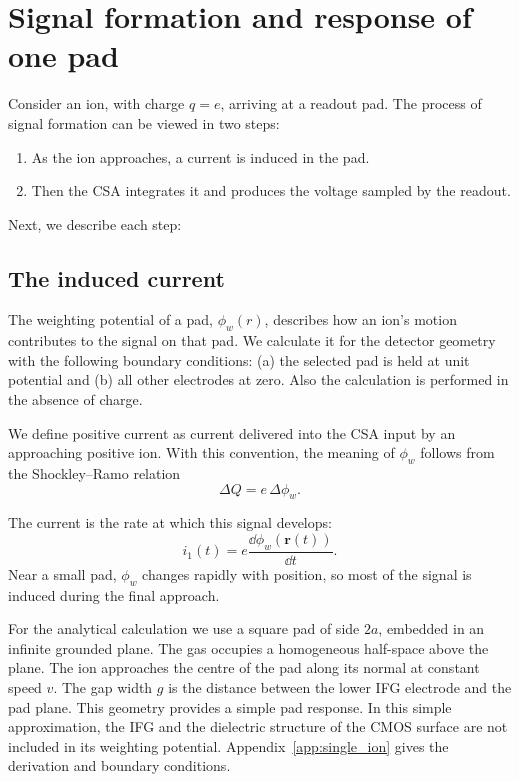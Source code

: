 \section{Signal formation and response of one pad}
\label{sec:single_ion}

Consider an ion, with charge $q=e$, arriving at a readout pad. The process of signal formation can be viewed in two steps:
\begin{enumerate}
\item As the ion approaches, a current is induced in the pad.
\item Then the CSA integrates it and produces the voltage sampled by the readout.
\end{enumerate}

Next, we describe each step:

\subsection{The induced current}

The weighting potential of a pad, $\phi_{w}(r)$, describes how an ion’s motion contributes to the signal on that pad. We calculate it for the detector geometry with the following boundary conditions: (a) the selected pad is held at unit potential and (b) all other electrodes at zero. Also the calculation is performed in the absence of charge.

We define positive current as current delivered into the CSA input by an approaching positive ion. With this convention, the meaning of $\phi_w$ follows from the Shockley--Ramo relation~\cite{riegler2016}
\begin{equation}
 \Delta Q=e\,\Delta\phi_w.
 \label{eq:single_charge}
\end{equation}

The current is the rate at which this signal develops:
\begin{equation}
 i_1(t)=e\frac{\dd\phi_w(\mathbf r(t))}{\dd t}.
 \label{eq:single_ramo}
\end{equation}
Near a small pad, $\phi_w$ changes rapidly with position, so most of the signal is induced during the final approach.

For the analytical calculation we use a square pad of side $2a$, embedded in an infinite grounded plane. The gas occupies a homogeneous half-space above the plane. The ion approaches the centre of the pad along its normal at constant speed $v$. The gap width $g$ is the distance between the lower IFG electrode and the pad plane. This geometry provides a simple pad response. In this simple approximation, the IFG and the dielectric structure of the CMOS surface are not included in its weighting potential. Appendix~\ref{app:single_ion} gives the derivation and boundary conditions.

